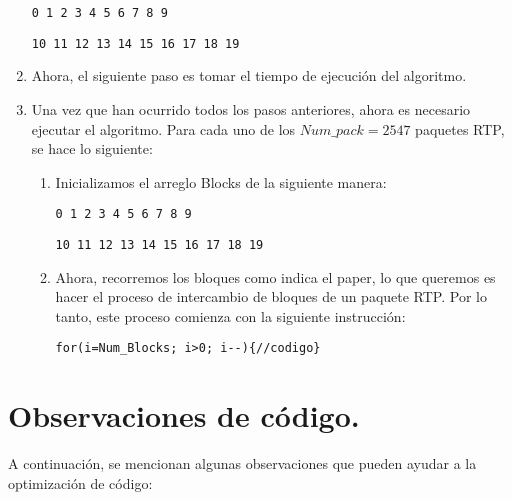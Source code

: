 \documentclass[10pt]{IEEEtran}
\begin{document}
\begin{enumerate}
\begin{verbatim}
0 1 2 3 4 5 6 7 8 9 
\end{verbatim}
\begin{verbatim}
10 11 12 13 14 15 16 17 18 19 
\end{verbatim}

\item Ahora, el siguiente paso es tomar el tiempo de ejecución del algoritmo.


\item Una vez que han ocurrido todos los pasos anteriores, ahora es necesario ejecutar el algoritmo. Para cada uno de los $Num\_pack = 2547$ paquetes RTP, se hace lo siguiente:
\begin{enumerate}
\item Inicializamos el arreglo Blocks de la siguiente manera:
\begin{verbatim}
0 1 2 3 4 5 6 7 8 9 
\end{verbatim}
\begin{verbatim}
10 11 12 13 14 15 16 17 18 19 
\end{verbatim}

\item Ahora, recorremos los bloques como indica el paper, lo que queremos es hacer el proceso de intercambio de bloques de un paquete RTP. Por lo tanto, este proceso comienza con la siguiente instrucción:


\begin{verbatim}
for(i=Num_Blocks; i>0; i--){//codigo}
\end{verbatim}


\end{enumerate}

\end{enumerate}


\section{Observaciones de código.}
A continuación, se mencionan algunas observaciones que pueden ayudar a la optimización de código:
\end{document}

